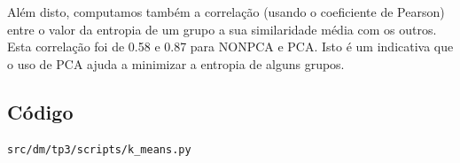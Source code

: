 \documentclass[brazil,a4paper,12pt]{article}
\begin{document}
Além disto, computamos também a correlação (usando o coeficiente de Pearson) entre o valor da entropia
de um grupo a sua similaridade média com os outros. Esta correlação foi de 0.58 e 0.87 para NONPCA e
PCA. Isto é um indicativa que o uso de PCA ajuda a minimizar a entropia de alguns grupos.

\subsection{Código}

\begin{verbatim}
src/dm/tp3/scripts/k_means.py
\end{verbatim}



\end{document}
